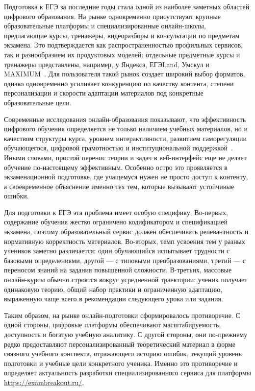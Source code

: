 \documentclass[a4paper,12pt]{extarticle}
\begin{document}
Подготовка к ЕГЭ за последние годы стала одной из наиболее заметных областей цифрового образования. 
На рынке одновременно присутствуют крупные образовательные платформы и специализированные онлайн-школы, 
предлагающие курсы, тренажеры, видеоразборы и консультации по предметам экзамена. 
Это подтверждается как распространенностью профильных сервисов, так и разнообразием их продуктовых моделей: 
отдельные предметные курсы и тренажеры представлены, например, 
у Яндекса, ЕГЭLand, Умскул и MAXIMUM~\cite{maximum2026ege,egeland2026,umschool2026,yandex2026ege_math}. 
Для пользователя такой рынок создает широкий выбор форматов, однако одновременно усиливает конкуренцию 
по качеству контента, степени персонализации и скорости адаптации материалов под конкретные образовательные цели.

Современные исследования онлайн-образования показывают, что эффективность цифрового обучения определяется не только 
наличием учебных материалов, но и качеством структуры курса, уровнем интерактивности, развитием саморегуляции 
обучающегося, цифровой грамотностью и институциональной поддержкой~\cite{vandorresteijn2025online}. 
Иными словами, простой перенос теории и задач в веб-интерфейс еще не делает обучение по-настоящему эффективным. 
Особенно остро это проявляется в экзаменационной подготовке, где учащемуся нужен не просто доступ к контенту, 
а своевременное объяснение именно тех тем, которые вызывают устойчивые ошибки.

Для подготовки к ЕГЭ эта проблема имеет особую специфику. Во-первых, содержание обучения жестко ограничено кодификатором и спецификацией экзамена, поэтому образовательный сервис должен обеспечивать релевантность и нормативную корректность материалов. Во-вторых, темп усвоения тем у разных учеников заметно различается: один обучающийся испытывает трудности с базовыми определениями, другой --- с типовыми преобразованиями, третий --- с переносом знаний на задания повышенной сложности. В-третьих, массовые онлайн-курсы обычно строятся вокруг усредненной траектории: ученик получает одинаковую теорию, общий набор практики и ограниченную адаптацию, выраженную чаще всего в рекомендации следующего урока или задания.

Таким образом, на рынке онлайн-подготовки сформировалось противоречие. С одной стороны, цифровые платформы обеспечивают масштабируемость, доступность и богатую учебную аналитику. С другой стороны, они по-прежнему редко предоставляют персонализированный теоретический материал в форме связного учебного конспекта, отражающего историю ошибок, текущий уровень подготовки и учебные цели конкретного ученика. Именно это противоречие и определяет актуальность разработки специализированного сервиса для платформы \url{https://exambreakout.ru/}.
\end{document}
